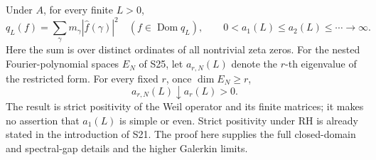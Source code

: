 \begin{theorem}
\label{AC-S03}
Under \(A\), for every finite \(L>0\),
\[
 q_L(f)=\sum_{\gamma}m_\gamma|\widehat f(\gamma)|^2
 \quad(f\in\operatorname{Dom}q_L),\qquad
 0<a_1(L)\leq a_2(L)\leq\cdots\longrightarrow\infty.
\]
Here the sum is over distinct ordinates of all nontrivial zeta zeros.
For the nested Fourier-polynomial spaces \(E_N\) of S25, let
\(a_{r,N}(L)\) denote the \(r\)-th eigenvalue of the restricted form.
For every fixed \(r\), once \(\dim E_N\geq r\),
\[
 a_{r,N}(L)\downarrow a_r(L)>0.
\]
The result is strict positivity of the Weil operator and its finite
matrices; it makes no assertion that \(a_1(L)\) is simple or even.
Strict positivity under RH is already stated in the introduction of
S21.  The proof here supplies the full closed-domain and spectral-gap
details and the higher Galerkin limits.
\end{theorem}
